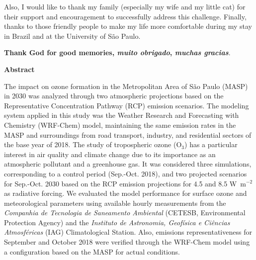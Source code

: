\begin{spacing}{1.5}
		Also, I would like to thank my family (especially my wife and my little cat) for their support and encouragement to successfully address this challenge.
		Finally, thanks to those friendly people to make my life more comfortable during my stay in Brazil and at the University of S\~{a}o Paulo.
		
		\textbf{Thank God for good memories,		
		\textit{muito obrigado},
      	\textit{muchas gracias}}.
		
		
		\cleardoublepage
	
	\begin{center}
		\LARGE \textbf{Abstract}\\[2cm]
	\end{center}
The impact on ozone formation in the Metropolitan Area of S\~{a}o Paulo (MASP) in 2030 was analyzed through two atmospheric projections based on the Representative Concentration Pathway (RCP) emission scenarios. The modeling system applied in this study was the Weather Research and Forecasting with Chemistry (WRF-Chem) model, maintaining the same emission rates in the MASP and surroundings from road transport, industry, and residential sectors of the base year of 2018.
The study of tropospheric ozone (O$_3$) has a particular interest in air quality and climate change due to its importance as an atmospheric pollutant and a greenhouse gas.
It was considered three simulations, corresponding to a control period (Sep.-Oct. 2018), and two projected scenarios for Sep.-Oct. 2030 based on the RCP emission projections for 4.5 and 8.5 W~m$^{-2}$ as radiative forcing.
We evaluated the model performance for surface ozone and meteorological parameters using available hourly measurements from the \textit{Companhia de Tecnologia de Saneamento Ambiental} (CETESB, Environmental Protection Agency) and the \textit{Instituto de Astronomia, Geofísica e Ciências Atmosféricas} (IAG) Climatological Station. Also, emissions representativeness for September and October 2018 were verified through the WRF-Chem model using a configuration based on the MASP for actual conditions.

\end{spacing}
